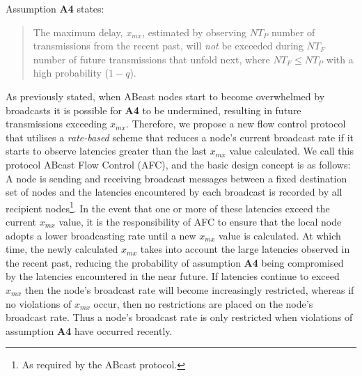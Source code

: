     Assumption \textbf{A4} states:
    
    \begin{quotation}
            The maximum delay, $x_{mx}$, estimated by observing $NT_P$ number of transmissions from the recent past, will \emph{not} be exceeded during $NT_F$ number of future transmissions that unfold next, where $NT_F \leq NT_P$ with a high probability ($1 - q$).
        \end{quotation}
    
    As previously stated, when \textsf{ABcast} nodes start to become overwhelmed by broadcasts it is possible for \textbf{A4} to be undermined, resulting in future transmissions exceeding $x_{mx}$.  Therefore, we propose a new flow control protocol that utilises a \emph{rate-based} scheme \citep{bertsekas1992DataNetworksFC} that reduces a node's current broadcast rate if it starts to observe latencies greater than the last $x_{mx}$ value calculated.  We call this protocol ABcast Flow Control (AFC), and the basic design concept is as follows: A node is sending and receiving broadcast messages between a fixed destination set of nodes and the latencies encountered by each broadcast is recorded by all recipient nodes\footnote{As required by the \textsf{ABcast} protocol.}.  In the event that one or more of these latencies exceed the current $x_{mx}$ value, it is the responsibility of AFC to ensure that the local node adopts a lower broadcasting rate until a new $x_{mx}$ value is calculated.  At which time, the newly calculated $x_{mx}$ takes into account the large latencies observed in the recent past, reducing the probability of assumption \textbf{A4} being compromised by the latencies encountered in the near future.  If latencies continue to exceed $x_{mx}$ then the node's broadcast rate will become increasingly restricted, whereas if no violations of $x_{mx}$ occur, then no restrictions are placed on the node's broadcast rate. Thus a node's broadcast rate is only restricted when violations of assumption \textbf{A4} have occurred recently.  

